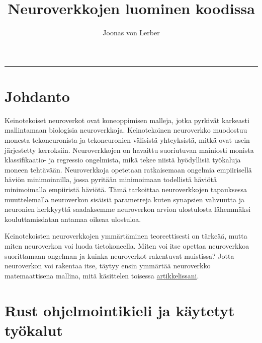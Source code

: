 \documentclass{article}
\author{Joonas von Lerber}
\title{Neuroverkkojen luominen koodissa}
\begin{document}
\maketitle

\tableofcontents

\vskip15pt
\hrule
\vskip15pt

\section{Johdanto}

Keinotekoiset neuroverkot ovat koneoppimisen malleja, jotka pyrkivät karkeasti mallintamaan biologisia neuroverkkoja.
Keinotekoinen neuroverkko muodostuu monesta tekoneuronista ja tekoneuronien välisistä yhteyksistä, mitkä ovat usein
järjestetty kerroksiin. Neuroverkkojen on havaittu suoriutuvan mainiosti monista klassifikaatio- ja regressio ongelmista,
mikä tekee niistä hyödyllisiä työkaluja moneen tehtävään. Neuroverkkoja opetetaan ratkaisemaan ongelmia empiirisellä
häviön minimoinnilla\cite{vapnik1999nature}, jossa pyritään minimoimaan todellistä häviötä minimoimalla empiiristä häviötä.
Tämä tarkoittaa neuroverkkojen tapauksessa muuttelemalla neuroverkon sisäisiä parametreja kuten synapsien vahvuutta ja neuronien
herkkyyttä saadaksemme neuroverkon arvion ulostulosta lähemmäksi kouluttamisdatan antamaa oikeaa ulostuloa.

Keinotekoisten neuroverkkojen ymmärtäminen teoreettisesti on tärkeää, mutta miten neuroverkon voi luoda tietokoneella.
Miten voi itse opettaa neuroverkkoa suorittamaan ongelman ja kuinka neuroverkot rakentuvat muistissa? %
Jotta neuroverkon voi rakentaa itse, täytyy ensin ymmärtää neuroverkko matemaattisena mallina, mitä käsittelen toisessa \href{http://example.com}{artikkelissani}. %

\section{Rust ohjelmointikieli ja käytetyt työkalut}
\end{document}
